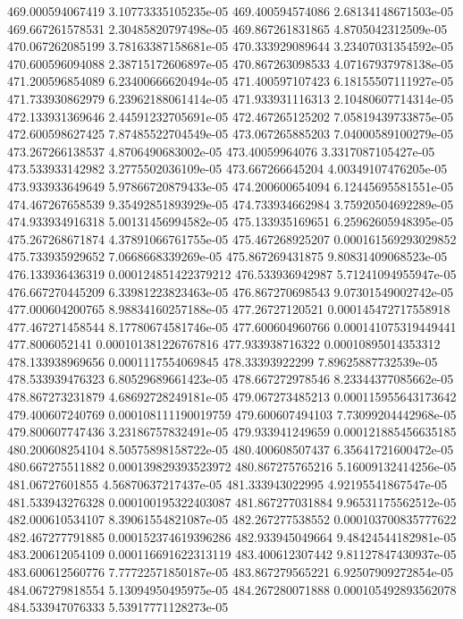 {469.000594067419 3.10773335105235e-05
469.400594574086 2.68134148671503e-05
469.667261578531 2.30485820797498e-05
469.867261831865 4.8705042312509e-05
470.067262085199 3.78163387158681e-05
470.333929089644 3.23407031354592e-05
470.600596094088 2.38715172606897e-05
470.867263098533 4.07167937978138e-05
471.200596854089 6.23400666620494e-05
471.400597107423 6.18155507111927e-05
471.733930862979 6.23962188061414e-05
471.933931116313 2.10480607714314e-05
472.133931369646 2.44591232705691e-05
472.467265125202 7.05819439733875e-05
472.600598627425 7.87485522704549e-05
473.067265885203 7.04000589100279e-05
473.267266138537 4.8706490683002e-05
473.40059964076 3.3317087105427e-05
473.533933142982 3.2775502036109e-05
473.667266645204 4.00349107476205e-05
473.933933649649 5.97866720879433e-05
474.200600654094 6.12445695581551e-05
474.467267658539 9.35492851893929e-05
474.733934662984 3.75920504692289e-05
474.933934916318 5.00131456994582e-05
475.133935169651 6.25962605948395e-05
475.267268671874 4.37891066761755e-05
475.467268925207 0.000161569293029852
475.733935929652 7.0668668339269e-05
475.867269431875 9.80831409068523e-05
476.133936436319 0.000124851422379212
476.533936942987 5.71241094955947e-05
476.667270445209 6.33981223823463e-05
476.867270698543 9.07301549002742e-05
477.000604200765 8.98834160257188e-05
477.26727120521 0.000145472717558918
477.467271458544 8.17780674581746e-05
477.600604960766 0.000141075319449441
477.8006052141 0.000101381226767816
477.933938716322 0.00010895014353312
478.133938969656 0.0001117554069845
478.33393922299 7.89625887732539e-05
478.533939476323 6.80529689661423e-05
478.667272978546 8.23344377085662e-05
478.867273231879 4.68692728249181e-05
479.067273485213 0.000115955643173642
479.400607240769 0.000108111190019759
479.600607494103 7.73099204442968e-05
479.800607747436 3.23186757832491e-05
479.933941249659 0.000121885456635185
480.200608254104 8.50575898158722e-05
480.400608507437 6.35641721600472e-05
480.667275511882 0.000139829393523972
480.867275765216 5.16009132414256e-05
481.06727601855 4.56870637217437e-05
481.333943022995 4.92195541867547e-05
481.533943276328 0.000100195322403087
481.867277031884 9.96531175562512e-05
482.000610534107 8.39061554821087e-05
482.267277538552 0.000103700835777622
482.467277791885 0.000152374619396286
482.933945049664 9.48424544182981e-05
483.200612054109 0.000116691622313119
483.400612307442 9.81127847430937e-05
483.600612560776 7.77722571850187e-05
483.867279565221 6.92507909272854e-05
484.067279818554 5.13094950495975e-05
484.267280071888 0.000105492893562078
484.533947076333 5.53917771128273e-05
}
